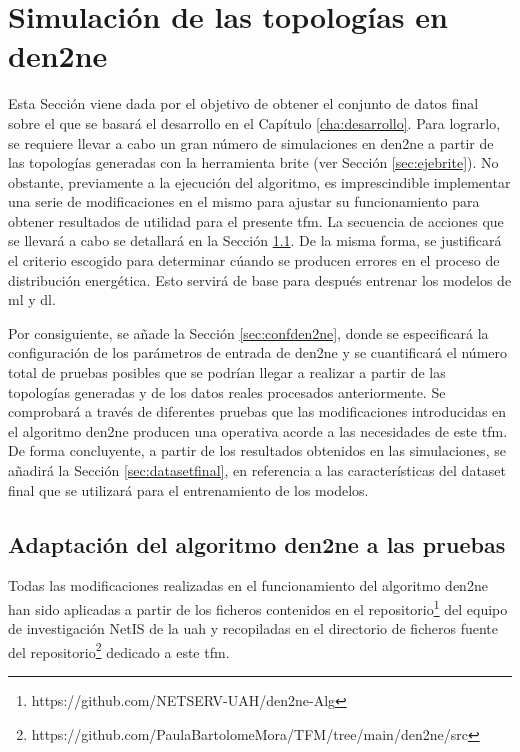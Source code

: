 \section{Simulación de las topologías en \acrshort{den2ne}}

Esta Sección viene dada por el objetivo de obtener el conjunto de datos final sobre el que se basará el desarrollo en el Capítulo \ref{cha:desarrollo}. Para lograrlo, se requiere llevar a cabo un gran número de  simulaciones en \gls{den2ne} a partir de las topologías generadas con la herramienta \gls{brite} (ver Sección \ref{sec:ejebrite}). No obstante, previamente a la ejecución del algoritmo, es imprescindible implementar una serie de modificaciones en el mismo para ajustar su funcionamiento para obtener resultados de utilidad para el presente \gls{tfm}. La secuencia de acciones que se llevará a cabo se detallará en la Sección \ref{sec:cambiosden2ne}. De la misma forma, se justificará el criterio escogido para determinar cúando se producen errores en el proceso de distribución energética. Esto servirá de base para después entrenar los modelos de \gls{ml} y \gls{dl}.

\vspace{3mm}

Por consiguiente, se añade la Sección \ref{sec:confden2ne}, donde se especificará la configuración de los parámetros de entrada de \gls{den2ne} y se cuantificará el número total de pruebas posibles que se podrían llegar a realizar a partir de las topologías generadas y de los datos reales procesados anteriormente. Se comprobará a través de diferentes pruebas que las modificaciones introducidas en el algoritmo \gls{den2ne} producen una operativa acorde a las necesidades de este \gls{tfm}. De forma concluyente, a partir de los resultados obtenidos en las simulaciones, se añadirá la Sección \ref{sec:datasetfinal}, en referencia a las características del dataset final que se utilizará para el entrenamiento de los modelos.

\subsection{Adaptación del algoritmo \acrshort{den2ne} a las pruebas}
\label{sec:cambiosden2ne}

Todas las modificaciones realizadas en el funcionamiento del algoritmo \acrshort{den2ne} han sido aplicadas a partir de los ficheros contenidos en el repositorio\footnote{https://github.com/NETSERV-UAH/den2ne-Alg} del equipo de investigación NetIS de la \gls{uah} y recopiladas en el directorio de ficheros fuente del repositorio\footnote{https://github.com/PaulaBartolomeMora/TFM/tree/main/den2ne/src} dedicado a este \gls{tfm}.

